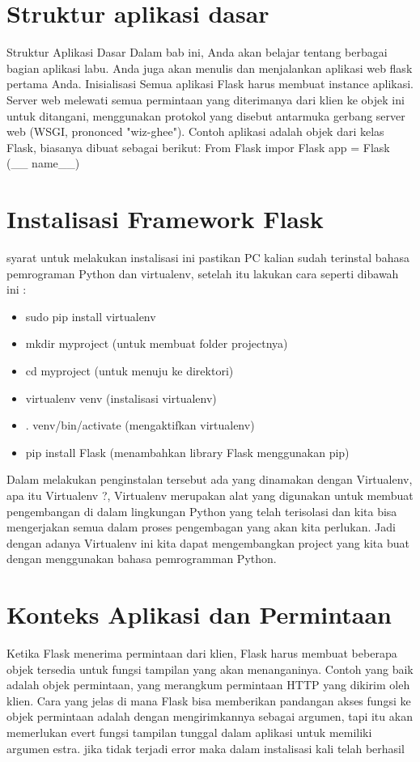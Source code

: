 \section{Struktur aplikasi dasar}
Struktur Aplikasi Dasar 
Dalam bab ini, Anda akan belajar tentang berbagai bagian aplikasi labu. Anda juga akan menulis dan menjalankan aplikasi web flask pertama Anda. 
Inisialisasi 
Semua aplikasi Flask harus membuat instance aplikasi. Server web melewati semua permintaan yang diterimanya dari klien ke objek ini untuk ditangani, menggunakan protokol yang disebut antarmuka gerbang server web (WSGI, prononced "wiz-ghee"). Contoh aplikasi adalah objek dari kelas Flask, biasanya dibuat sebagai berikut: 
From Flask impor Flask 
app = Flask (__ name__)

\section{Instalisasi Framework Flask}
syarat untuk melakukan instalisasi ini pastikan PC kalian sudah terinstal bahasa pemrograman Python dan virtualenv, setelah
itu lakukan cara seperti dibawah ini :
\begin{itemize}
\item sudo pip install virtualenv 
\item mkdir myproject (untuk membuat folder projectnya)
\item cd myproject (untuk menuju ke direktori)
\item virtualenv venv (instalisasi virtualenv)
\item . venv/bin/activate (mengaktifkan virtualenv)
\item pip install Flask (menambahkan library Flask menggunakan pip)
\end{itemize}
Dalam melakukan penginstalan tersebut ada yang dinamakan dengan Virtualenv, apa itu Virtualenv ?, Virtualenv merupakan alat yang
digunakan untuk membuat pengembangan di dalam lingkungan Python yang telah terisolasi dan kita bisa mengerjakan semua dalam
proses pengembagan yang akan kita perlukan. Jadi dengan adanya Virtualenv ini kita dapat mengembangkan project yang kita buat
dengan menggunakan bahasa pemrogramman Python.

\section{Konteks Aplikasi dan Permintaan}
Ketika Flask menerima permintaan dari klien, Flask harus membuat beberapa objek tersedia untuk fungsi tampilan yang akan menanganinya. Contoh yang baik adalah objek permintaan, yang merangkum permintaan HTTP yang dikirim oleh klien. Cara yang jelas di mana Flask bisa memberikan pandangan akses fungsi ke objek permintaan adalah dengan mengirimkannya sebagai argumen, tapi itu akan memerlukan evert fungsi tampilan tunggal dalam aplikasi untuk memiliki argumen estra.
jika tidak terjadi error maka dalam instalisasi kali telah berhasil

